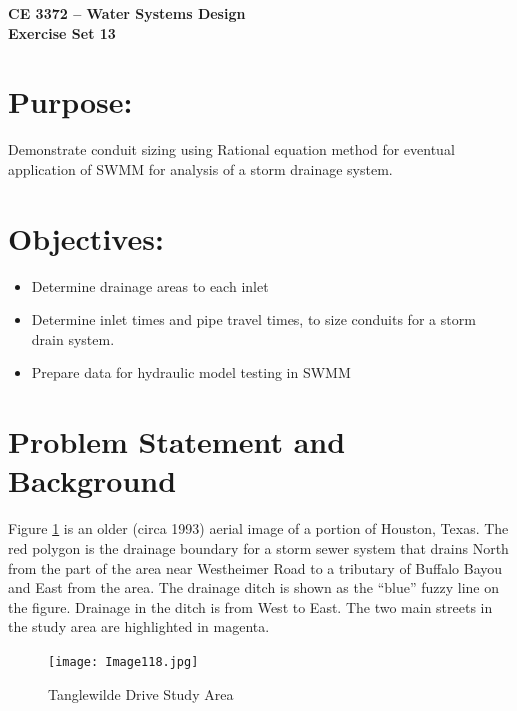 \documentclass[12pt]{article}
\begin{document}
\begin{center}
{\textbf{{ CE 3372 -- Water Systems Design} \\ {Exercise Set 13}}}
\end{center}
\section*{\small{Purpose:}}
Demonstrate conduit sizing using Rational equation method for eventual application of SWMM for analysis of a storm drainage system.
\section*{\small{Objectives:}}
\begin{itemize}
\item Determine drainage areas to each inlet
\item Determine inlet times and pipe travel times, to size conduits for a storm drain system.
\item Prepare data for hydraulic model testing in SWMM
\end{itemize}

\section*{\small{Problem Statement and Background}}
Figure \ref{fig:aerial} is an older (circa 1993) aerial image of a portion of Houston, Texas.   
The red polygon is the drainage boundary for a storm sewer system that drains North from the part of the area near Westheimer Road to a tributary of Buffalo Bayou and East from the area.
The drainage ditch is shown as the ``blue''   fuzzy line on the figure.  
Drainage in the ditch is from West to East.
The two main streets in the study area are highlighted in magenta.  

\begin{figure}[h!] %
   \centering
   \texttt{[image: Image118.jpg]} 
   \caption{Tanglewilde Drive Study Area}
   \label{fig:aerial}
\end{figure}
\clearpage
\end{document}
